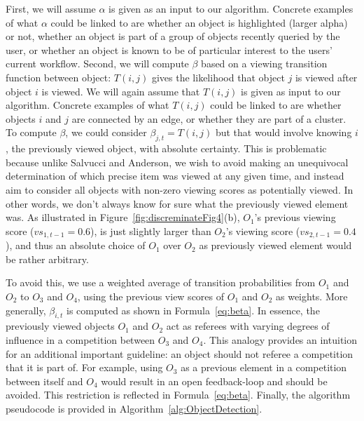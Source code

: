 First, we will assume $\alpha$ is given as an input to our algorithm. Concrete examples of what $\alpha$ could be linked to are whether an object is highlighted (larger alpha) or not, whether an object is part of a group of objects recently queried by the user, or whether an object is known to be of particular interest to the users' current workflow. 
Second, we will compute $\beta$ based on a viewing transition function between object:  $T(i,j)$ gives the likelihood that object $j$ is viewed after object $i$ is viewed. We will again assume that $T(i,j)$ is given as input to our algorithm. Concrete examples of what $T(i,j)$ could be linked to are whether objects $i$ and $j$ are connected by an edge, or whether they are part of a cluster. To compute $\beta$, we could consider $\beta_{j,t} = T(i,j)$ but that would involve knowing $i$, the previously viewed object, with absolute certainty. This is problematic because unlike Salvucci and Anderson, we wish to avoid making an unequivocal determination of which precise item was viewed at any given time, and instead aim to consider all objects with non-zero viewing scores as potentially viewed. In other words, we don't always know for sure what the previously viewed element was. As illustrated in Figure~\ref{fig:discreminateFig4}(b), $O_1$'s previous viewing score ($vs_{1,t-1}=0.6$), is just slightly larger than $O_2$'s viewing score ($vs_{2,t-1}=0.4$), and thus an absolute choice of $O_1$ over $O_2$ as previously viewed element would be rather arbitrary. 

To avoid this, we use a weighted average of transition probabilities from $O_1$ and $O_2$ to $O_3$ and $O_4$, using the previous view scores of $O_1$ and $O_2$ as weights.  More generally, $\beta_{i,t}$ is computed as shown in Formula~\ref{eq:beta}. In essence, the previously viewed objects $O_1$ and $O_2$ act as referees with varying degrees of influence in a competition between $O_3$ and $O_4$. This analogy provides an intuition for an additional important guideline: an object should not referee a competition that it is part of. For example, using $O_3$ as a previous element in a competition between itself and $O_4$ would result in an open feedback-loop and should be avoided. This restriction is reflected in Formula~\ref{eq:beta}.  Finally, the algorithm pseudocode is provided in Algorithm~\ref{alg:ObjectDetection}.

